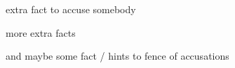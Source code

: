 \item extra fact to accuse somebody

\item more extra facts
\item and maybe some fact / hints to fence of accusations
